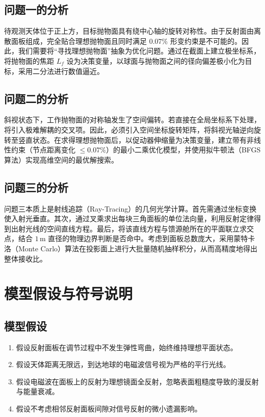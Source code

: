 \documentclass[UTF8,a4paper,zihao=-4]{ctexart}
\begin{document}
\subsection{问题一的分析}
待观测天体位于正上方，目标抛物面具有绕中心轴的旋转对称性。由于反射面由离散面板组成，完全贴合理想抛物面且同时满足 $0.07\%$ 形变约束是不可能的。因此，我们需要将“寻找理想抛物面”抽象为优化问题。通过在截面上建立极坐标系，将抛物面的焦距 $L_f$ 设为决策变量，以球面与抛物面之间的径向偏差极小化为目标，采用二分法进行数值逼近。

\subsection{问题二的分析}
斜视状态下，工作抛物面的对称轴发生了空间偏转。若直接在全局坐标系下处理，将引入极难解耦的交叉项。因此，必须引入空间坐标旋转矩阵，将斜视光轴逆向旋转至竖直状态。在求得理想抛物面后，以促动器伸缩量为决策变量，建立带有非线性约束（节点距离变化 $\le 0.07\%$）的最小二乘优化模型，并使用拟牛顿法（BFGS 算法）实现高维空间的最优解搜索。

\subsection{问题三的分析}
问题三本质上是射线追踪（Ray-Tracing）的几何光学计算。首先需通过坐标变换使入射光垂直。其次，通过叉乘求出每块三角面板的单位法向量，利用反射定律得到出射光线的空间直线方程。最后，将该直线方程与馈源舱所在的平面联立求交点，结合 $1\,\mathrm{m}$ 直径的物理边界判断是否命中。考虑到面板总数庞大，采用蒙特卡洛（Monte Carlo）算法在投影面上进行大批量随机抽样积分，从而高精度地得出整体接收比。

\section{模型假设与符号说明}

\subsection{模型假设}
\begin{enumerate}[label=(\arabic*), itemsep=0.3em]
    \item 假设反射面板在调节过程中不发生弹性弯曲，始终维持理想平面状态。
    \item 假设天体距离无限远，到达地球的电磁波信号视为严格的平行光线。
    \item 假设电磁波在面板上的反射为理想镜面全反射，忽略表面粗糙度导致的漫反射与能量衰减。
    \item 假设不考虑相邻反射面板间隙对信号反射的微小遗漏影响。
\end{enumerate}
\end{document}
